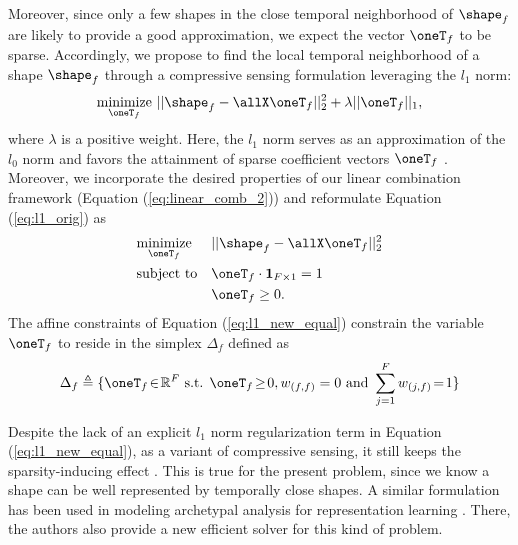 Moreover,
since only a few shapes in the close temporal neighborhood of $\shape_f$ are likely to provide a good approximation, we expect the vector $\oneT_f$ to be sparse.
Accordingly, we propose to find the local temporal neighborhood of a shape $\shape_f$ through a compressive sensing formulation leveraging the $l_1$ norm:
\begin{equation}
\underset{\oneT_f}{\text{minimize}} ~ ||\shape_f - \allX \oneT_f||_2^2 + \lambda||\oneT_f||_1,
\label{eq:l1_orig}
\end{equation}
where $\lambda$ is a positive weight. Here, the $l_1$ norm serves as an approximation of the $l_0$ norm and favors the attainment of sparse coefficient vectors $\oneT_f$ \cite{bach2012optimization}.
Moreover,  we incorporate the desired properties of our linear combination framework (Equation (\ref{eq:linear_comb_2})) and reformulate Equation (\ref{eq:l1_orig}) as
\begin{equation}
\begin{aligned}
& \underset{\oneT_f}{\text{minimize}} && ||\shape_f - \allX\oneT_f||_2^2 \\
& \text{subject to} && \oneT_f \cdot \mathbf 1_{F\times 1}= 1 \\
&                   && \oneT_f \geq 0.
\end{aligned}
\label{eq:l1_new_equal}
\end{equation}
The affine constraints of Equation (\ref{eq:l1_new_equal}) constrain the variable $\oneT_f$ to reside in the simplex $\Delta_f$ defined as
\begin{equation}
\Delta_f \triangleq \{ \oneT_f \! \in \! \mathbb{R}^F \text{ s.t. } \oneT_f \! \geq \! 0, w_{(f,f)}=0 \text{ and } \sum_{j=1}^{F} w_{(j,f)} \! = \! 1 \}
\end{equation}

Despite the lack of an explicit $l_1$ norm regularization term in
Equation (\ref{eq:l1_new_equal}), as a variant of compressive sensing, it still keeps the sparsity-inducing effect \cite{bach2012optimization,chen:hal-00995911}. This is true for the present problem, since we know a shape can be well represented by temporally close shapes. A similar formulation has been used in modeling archetypal analysis for representation learning \cite{chen:hal-00995911}. There, the authors also provide a new efficient solver for this kind of problem.

